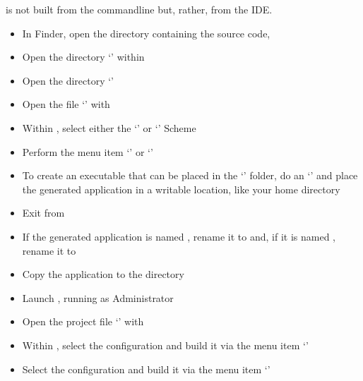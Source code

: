 \secondaryEnd
{}
\textit{\CMU} is not built from the command\longDash{}line but, rather, from the IDE.
\begin{itemize}
\item In Finder, open the directory containing the \mplusm{} source code, 
\item\exSp{} Open the directory `' within
\item\exSp{} Open the directory `'
\item\exSp{} Open the file `' with 
\item\exSp{} Within , select either the `' or
`' Scheme
\item\exSp{} Perform the menu item `' or
`'
\item\exSp{} To create an executable that can be placed in the `'
folder, do an `'
and place the generated application in a writable location, like your home directory
\item\exSp{} Exit from 
\item\exSp{} If the generated application is named , rename
it to  and, if it is named ,
rename it to 
\item\exSp{} Copy the  application to the 
directory
\end{itemize}
\tertiaryEnd
{}
\begin{itemize}
\item Launch , running as Administrator
\item\exSp{} Open the project file
`' with
\item\exSp{} Within , select the  configuration and
build it via the menu item `'
\item\exSp{} Select the  configuration and build it via the menu item
`'
\end{itemize}
